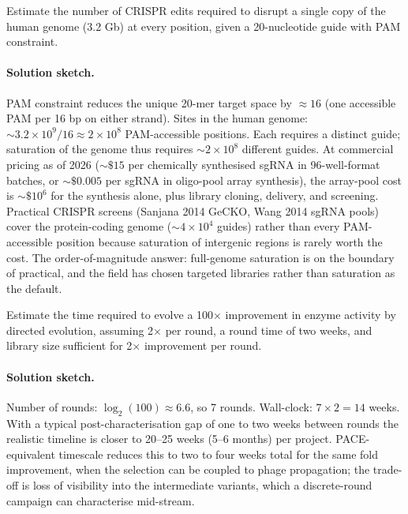 \begin{exercise}
Estimate the number of CRISPR edits required to disrupt a single
copy of the human genome (3.2 Gb) at every position, given a
20-nucleotide guide with PAM constraint.

\paragraph{Solution sketch.}
PAM constraint reduces the unique 20-mer target space by
$\approx 16$ (one accessible PAM per 16 bp on either strand).
Sites in the human genome: $\sim 3.2 \times 10^{9}/16 \approx 2 \times 10^{8}$
PAM-accessible positions. Each requires a distinct guide; saturation
of the genome thus requires $\sim 2 \times 10^{8}$ different guides.
At commercial pricing as of 2026 ($\sim \$15$ per chemically synthesised
sgRNA in 96-well-format batches, or $\sim \$0.005$ per sgRNA in
oligo-pool array synthesis), the array-pool cost is
$\sim \$10^{6}$ for the synthesis alone, plus library cloning,
delivery, and screening. Practical CRISPR screens (Sanjana 2014
GeCKO, Wang 2014 sgRNA pools) cover the protein-coding genome
($\sim 4 \times 10^{4}$ guides) rather than every PAM-accessible
position because saturation of intergenic regions is rarely worth
the cost. The order-of-magnitude answer: full-genome saturation is
on the boundary of practical, and the field has chosen targeted
libraries rather than saturation as the default.
\end{exercise}

\begin{exercise}
Estimate the time required to evolve a 100$\times$ improvement in
enzyme activity by directed evolution, assuming 2$\times$ per round,
a round time of two weeks, and library size sufficient for
2$\times$ improvement per round.

\paragraph{Solution sketch.}
Number of rounds: $\log_{2}(100) \approx 6.6$, so 7 rounds.
Wall-clock: $7 \times 2 = 14$ weeks. With a typical
post-characterisation gap of one to two weeks between rounds the
realistic timeline is closer to 20--25 weeks (5--6 months) per
project. PACE-equivalent timescale reduces this to two to four
weeks total for the same fold improvement, when the selection
can be coupled to phage propagation; the trade-off is loss of
visibility into the intermediate variants, which a discrete-round
campaign can characterise mid-stream.
\end{exercise}

